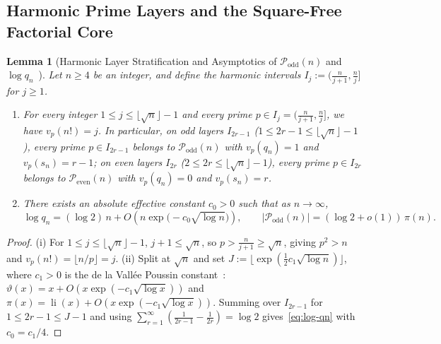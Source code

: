 \documentclass[11pt,reqno]{amsart}
\newtheorem{lemma}[theorem]{Lemma}
\theoremstyle{remark}
\newcommand{\Podd}{\mathcal{P}_{\mathrm{odd}}}
\newcommand{\Peven}{\mathcal{P}_{\mathrm{even}}}
\newcommand{\li}{\operatorname{li}}
\begin{document}
\subsection{Harmonic Prime Layers and the Square-Free Factorial Core}
\begin{lemma}[Harmonic Layer Stratification and Asymptotics of $\Podd(n)$ and $\log q_n$~\cite{Berend1997,Sander2001,Broughan2002}]\label{lem:2.1}
Let $n \ge 4$ be an integer, and define the harmonic intervals $I_j := (\frac{n}{j+1}, \frac{n}{j}]$ for $j \ge 1$.
\begin{enumerate}
\item[(i)] For every integer $1 \le j \le \lfloor \sqrt{n} \rfloor - 1$ and every prime $p \in I_j = (\frac{n}{j+1}, \frac{n}{j}]$, we have $v_p(n!) = j$. In particular, on odd layers $I_{2r-1}$ ($1 \le 2r - 1 \le \lfloor \sqrt{n} \rfloor - 1$), every prime $p \in I_{2r-1}$ belongs to $\Podd(n)$ with $v_p(q_n) = 1$ and $v_p(s_n) = r - 1$; on even layers $I_{2r}$ ($2 \le 2r \le \lfloor \sqrt{n} \rfloor - 1$), every prime $p \in I_{2r}$ belongs to $\Peven(n)$ with $v_p(q_n) = 0$ and $v_p(s_n) = r$.
\item[(ii)] There exists an absolute effective constant $c_0 > 0$ such that as $n \to \infty$,
\begin{equation}\label{eq:log-qn}
\log q_n = (\log 2)\, n + O\!\left(n \exp\bigl(-c_0 \sqrt{\log n}\bigr)\right), \qquad |\Podd(n)| = (\log 2 + o(1))\, \pi(n).
\end{equation}
\end{enumerate}
\end{lemma}
\begin{proof}
(i) For $1 \le j \le \lfloor \sqrt{n} \rfloor - 1$, $j + 1 \le \sqrt{n}$, so $p > \frac{n}{j+1} \ge \sqrt{n}$, giving $p^2 > n$ and $v_p(n!) = \lfloor n/p \rfloor = j$.
(ii) Split at $\sqrt{n}$ and set $J := \lfloor \exp(\frac{1}{2} c_1 \sqrt{\log n}) \rfloor$, where $c_1 > 0$ is the de la Vall\'ee Poussin constant~\cite[Chapter~18]{Davenport2000}: $\vartheta(x) = x + O(x \exp(-c_1\sqrt{\log x}))$ and $\pi(x) = \li(x) + O(x \exp(-c_1\sqrt{\log x}))$. Summing over $I_{2r-1}$ for $1 \le 2r - 1 \le J - 1$ and using $\sum_{r=1}^\infty (\frac{1}{2r-1} - \frac{1}{2r}) = \log 2$ gives~\eqref{eq:log-qn} with $c_0 = c_1 / 4$.
\end{proof}
\end{document}
